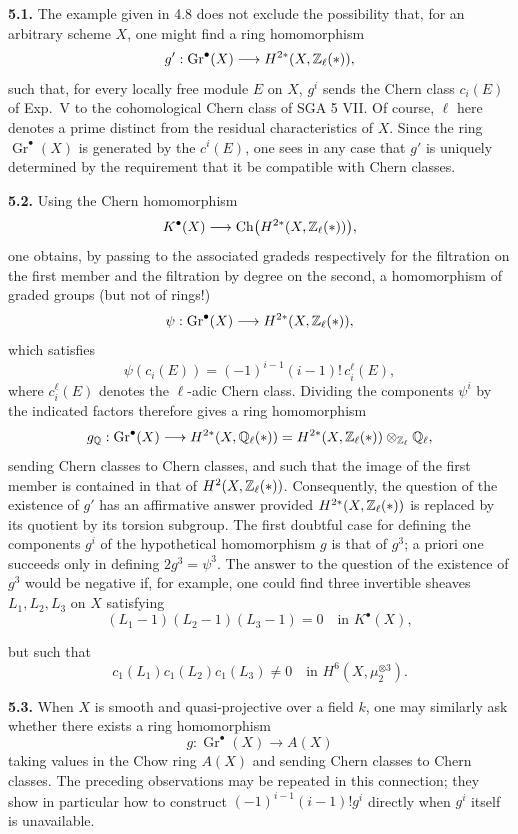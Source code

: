 \noindent\textbf{5.1.}
The example given in 4.8 does not exclude the possibility that, for an
arbitrary scheme $X$, one might find a ring homomorphism
\[
 g':\operatorname{Gr}^\bullet(X)
 \longrightarrow H^{2*}(X,\mathbb Z_\ell(*)),
\]
such that, for every locally free module $E$ on $X$, $g^i$ sends the Chern
class $c_i(E)$ of Exp.~V to the cohomological Chern class of SGA 5 VII. Of
course, $\ell$ here denotes a prime distinct from the residual
characteristics of $X$. Since the ring $\operatorname{Gr}^\bullet(X)$ is
generated by the $c^i(E)$, one sees in any case that $g'$ is uniquely
determined by the requirement that it be compatible with Chern classes.

\noindent\textbf{5.2.}
Using the Chern homomorphism
\[
 K^\bullet(X)\longrightarrow
 \operatorname{Ch}\bigl(H^{2*}(X,\mathbb Z_\ell(*))\bigr),
\]
one obtains, by passing to the associated gradeds respectively for the
filtration on the first member and the filtration by degree on the second,
a homomorphism of graded groups (but not of rings!)
\[
 \psi:\operatorname{Gr}^\bullet(X)
 \longrightarrow H^{2*}(X,\mathbb Z_\ell(*)),
\]
which satisfies
\[
 \psi(c_i(E))=(-1)^{i-1}(i-1)!\,c_i^\ell(E),
\]
where $c_i^\ell(E)$ denotes the $\ell$-adic Chern class. Dividing the
components $\psi^i$ by the indicated factors therefore gives a ring
homomorphism
\[
 g_\mathbb Q:\operatorname{Gr}^\bullet(X)
 \longrightarrow H^{2*}(X,\mathbb Q_\ell(*))
 =H^{2*}(X,\mathbb Z_\ell(*))\otimes_{\mathbb Z_\ell}\mathbb Q_\ell,
\]
sending Chern classes to Chern classes, and such that the image of the first
member is contained in that of $H^2(X,\mathbb Z_\ell(*))$. Consequently, the question
of the existence of $g'$ has an affirmative answer provided
$H^{2*}(X,\mathbb Z_\ell(*))$ is replaced by its quotient by its torsion subgroup.
The first doubtful case for defining the components $g^i$ of the
hypothetical homomorphism $g$ is that of $g^3$; a priori one succeeds only
in defining $2g^3=\psi^3$. The answer to the question of the existence of
$g^3$ would be negative if, for example, one could find three invertible
sheaves $L_1,L_2,L_3$ on $X$ satisfying
\[
 (L_1-1)(L_2-1)(L_3-1)=0
 \quad\text{in }K^\bullet(X),
\]

but such that
\[
 c_1(L_1)c_1(L_2)c_1(L_3)\ne0
 \quad\text{in }H^6(X,\mu_2^{\otimes3}).
\]

\noindent\textbf{5.3.}
When $X$ is smooth and quasi-projective over a field $k$, one may similarly
ask whether there exists a ring homomorphism
\[
 g:\operatorname{Gr}^\bullet(X)\longrightarrow A(X)
\]
taking values in the Chow ring $A(X)$ and sending Chern classes to Chern
classes. The preceding observations may be repeated in this connection;
they show in particular how to construct $(-1)^{i-1}(i-1)!g^i$ directly
when $g^i$ itself is unavailable.


